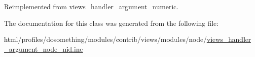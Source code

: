 Reimplemented from \hyperlink{classviews__handler__argument__numeric_a5c6f566b06bad6057e92f15d82311c7b}{views\_\-handler\_\-argument\_\-numeric}.

The documentation for this class was generated from the following file:\begin{DoxyCompactItemize}
\item 
html/profiles/dosomething/modules/contrib/views/modules/node/\hyperlink{views__handler__argument__node__nid_8inc}{views\_\-handler\_\-argument\_\-node\_\-nid.inc}\end{DoxyCompactItemize}
